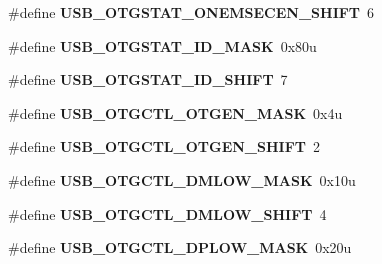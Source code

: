 \begin{DoxyCompactItemize}
\item 
\mbox{\label{group___u_s_b___register___masks_gaac9cb5de36e29af8366533e2c05c31ac}} 
\#define {\bfseries U\+S\+B\+\_\+\+O\+T\+G\+S\+T\+A\+T\+\_\+\+O\+N\+E\+M\+S\+E\+C\+E\+N\+\_\+\+S\+H\+I\+FT}~6
\item 
\mbox{\label{group___u_s_b___register___masks_gab1f78fae0de86d5ced423f41f9d6b098}} 
\#define {\bfseries U\+S\+B\+\_\+\+O\+T\+G\+S\+T\+A\+T\+\_\+\+I\+D\+\_\+\+M\+A\+SK}~0x80u
\item 
\mbox{\label{group___u_s_b___register___masks_ga4f674a8a6d13daeb25950cb78cfa625c}} 
\#define {\bfseries U\+S\+B\+\_\+\+O\+T\+G\+S\+T\+A\+T\+\_\+\+I\+D\+\_\+\+S\+H\+I\+FT}~7
\item 
\mbox{\label{group___u_s_b___register___masks_ga6cdb9b59615dfc774914e37d44f17e3a}} 
\#define {\bfseries U\+S\+B\+\_\+\+O\+T\+G\+C\+T\+L\+\_\+\+O\+T\+G\+E\+N\+\_\+\+M\+A\+SK}~0x4u
\item 
\mbox{\label{group___u_s_b___register___masks_ga45ccee22440e024d6e6096d5607372f6}} 
\#define {\bfseries U\+S\+B\+\_\+\+O\+T\+G\+C\+T\+L\+\_\+\+O\+T\+G\+E\+N\+\_\+\+S\+H\+I\+FT}~2
\item 
\mbox{\label{group___u_s_b___register___masks_ga929467feea7b1506c205dd78112a8a98}} 
\#define {\bfseries U\+S\+B\+\_\+\+O\+T\+G\+C\+T\+L\+\_\+\+D\+M\+L\+O\+W\+\_\+\+M\+A\+SK}~0x10u
\item 
\mbox{\label{group___u_s_b___register___masks_ga11854093d47631b4f11f0c50bf7a063f}} 
\#define {\bfseries U\+S\+B\+\_\+\+O\+T\+G\+C\+T\+L\+\_\+\+D\+M\+L\+O\+W\+\_\+\+S\+H\+I\+FT}~4
\item 
\mbox{\label{group___u_s_b___register___masks_gad6a988a0338aa5fcd511f9644b2375eb}} 
\#define {\bfseries U\+S\+B\+\_\+\+O\+T\+G\+C\+T\+L\+\_\+\+D\+P\+L\+O\+W\+\_\+\+M\+A\+SK}~0x20u
\item 
\mbox{\label{group___u_s_b___register___masks_ga94318731712f5399af57fefe46ac8cec}} 

\end{DoxyCompactItemize}
